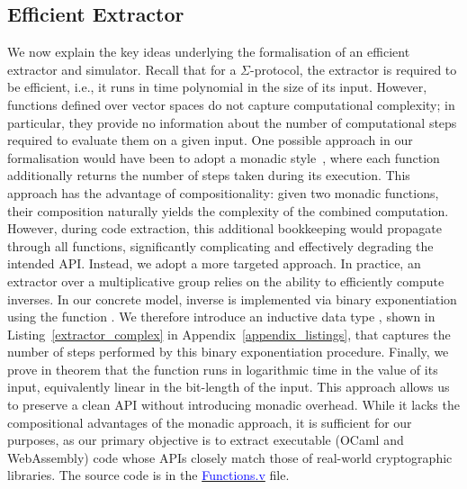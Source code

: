 \documentclass[sigconf,anonymous,review]{acmart}
\begin{document}
\subsection{Efficient Extractor}\label{eff_extractor}
We now explain the key ideas underlying the formalisation of an efficient extractor and simulator. Recall that for a $\Sigma$-protocol, the extractor is required to be efficient, i.e., it runs in time polynomial in the size of its input. However, functions defined over vector spaces do not capture computational complexity; in particular, they provide no information about the number of computational steps required to evaluate them on a given input. One possible approach in our formalisation would have been to adopt a monadic style~\cite{10.1145/3473585,10.1145/3158124}, where each function additionally returns the number of steps taken during its execution. This approach has the advantage of compositionality: given two monadic functions, their composition naturally yields the complexity of the combined computation. However, during code extraction, this additional bookkeeping would propagate through all functions, significantly complicating and effectively degrading the intended API. Instead, we adopt a more targeted approach. In practice, an extractor over a multiplicative group relies on the ability to efficiently compute inverses. In our concrete model, inverse is implemented via binary exponentiation using the function \texttt{}. We therefore introduce an inductive data type \texttt{}, shown in Listing~\ref{extractor_complex} in Appendix~\ref{appendix_listings}, that captures the number of steps performed by this binary exponentiation procedure. Finally, we prove in theorem \texttt{} that the function \texttt{} runs in logarithmic time in the value of its input, equivalently linear in the bit-length of the input. This approach allows us to preserve a clean API without introducing monadic overhead. While it lacks the compositional advantages of the monadic approach, it is sufficient for our purposes, as our primary objective is to extract executable (OCaml and WebAssembly) code whose APIs closely match those of real-world cryptographic libraries. The source code is in the \href{https://anonymous.4open.science/r/SigmaProtocol-EBA5/src/Utility/Functions.v}{\textcolor{blue}{Functions.v}} file.
\end{document}
